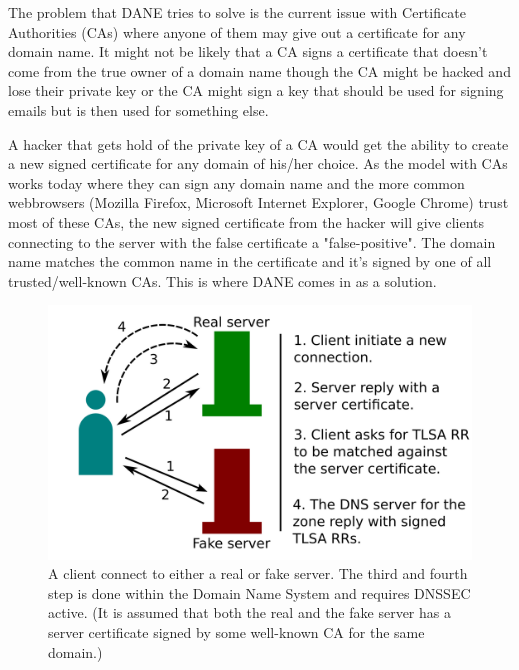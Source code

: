 The problem that DANE tries to solve is the current issue with Certificate Authorities (CAs) where anyone of them may give out a certificate for any domain name.
It might not be likely that a CA signs a certificate that doesn't come from the true owner of a domain name though the CA might be hacked and lose their private key or the CA might sign a key that should be used for signing emails but is then used for something else.

A hacker that gets hold of the private key of a CA would get the ability to create a new signed certificate for any domain of his/her choice.
As the model with CAs works today where they can sign any domain name and the more common webbrowsers (Mozilla Firefox, Microsoft Internet Explorer, Google Chrome) trust most of these CAs, the new signed certificate from the hacker will give clients connecting to the server with the false certificate a "false-positive".
The domain name matches the common name in the certificate and it's signed by one of all trusted/well-known CAs.
This is where DANE comes in as a solution.

\begin{figure}[ht]
\begin{center}
\includegraphics[scale=1]{Figures/daneWithTlsa.png}
\end{center}
\caption{A client connect to either a real or fake server. The third and fourth step is done within the Domain Name System and requires DNSSEC active. (It is assumed that both the real and the fake server has a server certificate signed by some well-known CA for the same domain.)\label{ch3:daneWithTlsa}}
\end{figure}

